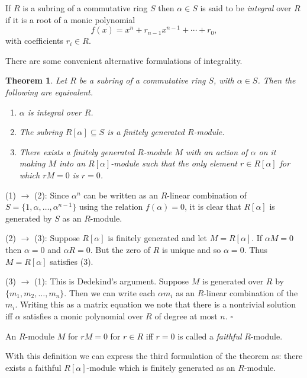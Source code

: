 \documentclass[10pt]{article}
\newcommand{\qed}{\square}
\newtheorem{theorem}{Theorem}[section]
\newenvironment{proof}[1][Proof]{\begin{trivlist}
\item[\hskip \labelsep {\bfseries #1}]}{\end{trivlist}}
\newenvironment{definition}[1][Definition]{\begin{trivlist}
\item[\hskip \labelsep {\bfseries #1}]}{\end{trivlist}}
\begin{document}
\begin{definition}
If $R$ is a subring of a commutative ring $S$ then $\alpha \in S$ is said to be \emph{integral} over $R$ if it is a root of a monic polynomial
$$f(x) = x^n + r_{n-1}x^{n-1} + \cdots + r_0,$$
with coefficients $r_i \in R$.
\end{definition}

There are some convenient alternative formulations of integrality.

\begin{theorem}
Let $R$ be a subring of a commutative ring $S$, with $\alpha \in S$. Then the following are equivalent.
\begin{enumerate}
\item $\alpha$ is integral over $R$.
\item The subring $R[\alpha] \subseteq S$ is a finitely generated $R$-module.
\item There exists a finitely generated $R$-module $M$ with an action of $\alpha$ on it making $M$ into an $R[\alpha]$-module such that the only element $r \in R[\alpha]$ for which $rM = 0$ is $r = 0$.
\end{enumerate}
\end{theorem}

\begin{proof}
(1) $\rightarrow$ (2): Since $\alpha^n$ can be written as an $R$-linear combination of $S = \{1, \alpha, \ldots, \alpha^{n-1}\}$ using the relation $f(\alpha) = 0$, it is clear that $R[\alpha]$ is generated by $S$ as an $R$-module.

(2) $\rightarrow$ (3): Suppose $R[\alpha]$ is finitely generated and let $M = R[\alpha]$. If $\alpha M = 0$ then $\alpha = 0$ and $\alpha R = 0$. But the zero of $R$ is unique and so $\alpha = 0$. Thus $M = R[\alpha]$ satisfies (3).

(3) $\rightarrow$ (1): This is Dedekind's argument. Suppose $M$ is generated over $R$ by $\{m_1, m_2, \ldots, m_n\}$. Then we can write each $\alpha m_i$ as an $R$-linear combination of the $m_i$. Writing this as a matrix equation we note that there is a nontrivial solution iff $\alpha$ satisfies a monic polynomial over $R$ of degree at most $n$. $\qed$
\end{proof}

\begin{definition}
An $R$-module $M$ for $rM = 0$ for $r \in R$ iff $r = 0$ is called a \emph{faithful} $R$-module.
\end{definition}

With this definition we can express the third formulation of the theorem as: there exists a faithful $R[\alpha]$-module which is finitely generated as an $R$-module.
\end{document}
